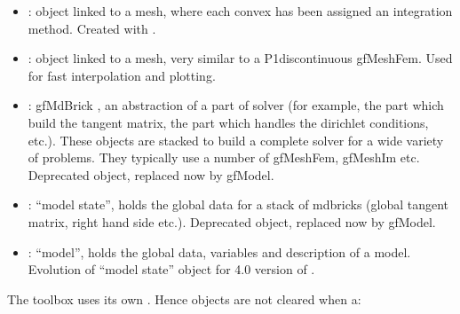 \documentclass[a4paper,11pt,english]{sphinxmanual}
\begin{document}
\begin{itemize}
\item {} 
 : object linked to a mesh, where each convex has been assigned
an integration method. Created with .

\item {} 
 : object linked to a mesh, very similar to a
P1\sphinxhyphen{}discontinuous gfMeshFem. Used for fast interpolation and plotting.

\item {} 
 : gfMdBrick , an abstraction of a part of solver (for
example, the part which build the tangent matrix, the part which handles the
dirichlet conditions, etc.). These objects are stacked to build a complete
solver for a wide variety of problems. They typically use a number of
gfMeshFem, gfMeshIm etc. Deprecated object, replaced now by gfModel.

\item {} 
 : “model state”, holds the global data for a stack of mdbricks
(global tangent matrix, right hand side etc.). Deprecated object, replaced now by gfModel.

\item {} 
 : “model”, holds the global data, variables and description of a
model. Evolution of “model state” object for 4.0 version of .

\end{itemize}

The  toolbox uses its own . Hence  objects
are not cleared when a:
\end{document}
